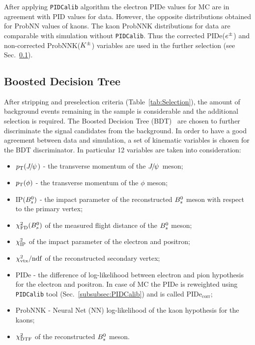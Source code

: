 After applying {\tt PIDCalib} algorithm the electron PIDe values for MC are in agreement with PID values for data. However, the opposite distributions obtained for ProbNN values of kaons. The kaon ProbNNK distributions for data are comparable with simulation without {\tt PIDCalib}. Thus the corrected PIDe(${e^\pm}$) and non-corrected ProbNNK(${{K}^\pm}$) variables are used in the further selection (see Sec.~\ref{subsec:BDT}).   

 \subsection{Boosted Decision Tree}\label{subsec:BDT}
  After stripping and preselection criteria (Table~\ref{tab:Selection}), the amount of background events remaining in the sample is considerable and the additional selection is required. The Boosted Decision Tree (BDT)~\cite{Hocker:2007ht} are chosen to further discriminate the signal candidates from the background. In order to have a good agreement between data and simulation, a set of kinematic variables is chosen for the BDT discriminator. In particular 12 variables are taken into consideration:
  \begin{itemize}
   \item $\mbox{$p_{\mathrm{ T}}$}({{J\mskip -3mu/\mskip -2mu\psi\mskip 2mu}})$ - the transverse momentum of the ${{J\mskip -3mu/\mskip -2mu\psi\mskip 2mu}}$ meson;
   \item $\mbox{$p_{\mathrm{ T}}$}(\phi)$ - the transverse momentum of the $\phi$ meson;
   \item IP$({{B}^0_{s}})$ - the impact parameter of the reconstructed ${{B}^0_{s}}$ meson with respect to the primary vertex;
   \item $\chi^2_{\text{FD}}({{B}^0_{s}})$ of the measured flight distance of the ${{B}^0_{s}}$ meson;
   \item $\chi^2_{\text{IP}}$ of the impact parameter of the electron and positron;
   \item $\chi^2_{\text{vtx}}/\mathrm{ndf}$ of the reconstructed secondary vertex;
   \item PIDe - the difference of log-likelihood between electron and pion hypothesis for the electron and positron. In case of MC the PIDe is reweighted using {\tt PIDCalib} tool (Sec.~\ref{subsubsec:PIDCalib}) and is called PIDe$_{\text{corr}}$;
   \item ProbNNK - Neural Net (NN) log-likelihood of the kaon hypothesis for the kaons;
   \item $\chi^2_{\text{DTF}}$ of the reconstructed ${{B}^0_{s}}$ meson. 
  \end{itemize}

